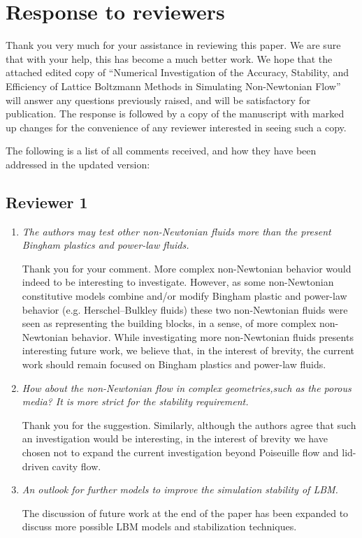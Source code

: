 \documentclass{article}
\begin{document}
	
	
\section*{Response to reviewers}

Thank you very much for your assistance in reviewing this paper. We are sure that with your help, this has become a much better work. We hope that the attached edited copy of ``Numerical Investigation of the Accuracy, Stability, and Efficiency of Lattice Boltzmann Methods in Simulating Non-Newtonian Flow'' will answer any questions previously raised, and will be satisfactory for publication.
The response is followed by a copy of the manuscript with marked up changes for the convenience of any reviewer interested in seeing such a copy.

The following is a list of all comments received, and how they have been addressed in the updated version:

  \subsection*{Reviewer 1}
	\begin{enumerate}
		\item \emph{The authors may test other non-Newtonian fluids more than the present Bingham plastics and power-law fluids.}
		
		Thank you for your comment.
		More complex non-Newtonian behavior would indeed to be interesting to investigate.
		However, as some non-Newtonian constitutive models combine and/or modify Bingham plastic and power-law behavior (e.g. Herschel–Bulkley fluids) these two non-Newtonian fluids were seen as representing the building blocks, in a sense, of more complex non-Newtonian behavior.
		While investigating more non-Newtonian fluids presents interesting future work, we believe that, in the interest of brevity, the current work should remain focused on Bingham plastics and power-law fluids.
		
		\item \emph{How about the non-Newtonian flow in complex geometries,such as the porous media? It is more strict for the stability requirement.}
		
		Thank you for the suggestion.
		Similarly, although the authors agree that such an investigation would be interesting, in the interest of brevity we have chosen not to expand the current investigation beyond Poiseuille flow and lid-driven cavity flow.
		
		\item \emph{An outlook for further models to improve the simulation stability of LBM.}
		
		The discussion of future work at the end of the paper has been expanded to discuss more possible LBM models and stabilization techniques.
	
	\end{enumerate}
\end{document}
